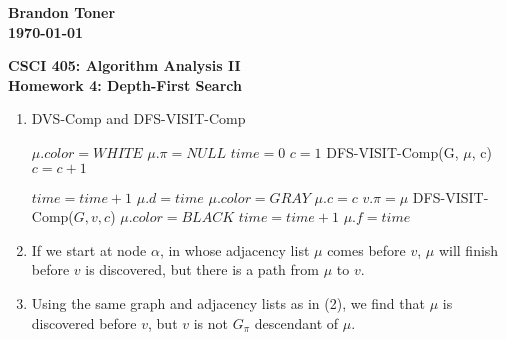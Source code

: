 \documentclass{article}%
\begin{document}
\begin{flushright}
\textbf{Brandon Toner \\
\today}
\end{flushright}

\begin{center}
\textbf{CSCI 405: Algorithm Analysis II \\
Homework 4: Depth-First Search} \\
\end{center}



\begin{enumerate}
\item  DVS-Comp and DFS-VISIT-Comp \\
\begin{algorithm}[H] 
  {
   $\mu.color = WHITE$\;
   $\mu.\pi = NULL$\;
 }
 $time = 0$\;
 $c = 1$ \;
  {
    {
     DFS-VISIT-Comp(G, $\mu$, c)\;
     $c = c + 1$\;
   }
 }
\end{algorithm}

\begin{algorithm}[H]
 $time = time + 1$\;
 $\mu.d = time$\;
 $\mu.color = GRAY$\;
 $\mu.c = c$\;
  {
    {
     $v.\pi = \mu$\;
     DFS-VISIT-Comp($G, v, c$)\;
   }
 }
 $\mu.color = BLACK$\;
 $time = time + 1$\;
 $\mu.f = time$\;
\end{algorithm}
\item If we start at node $\alpha$, in whose adjacency list $\mu$ comes before $v$, $\mu$ will finish before $v$ is discovered, but there is a path from $\mu$ to $v$. \\


\item Using the same graph and adjacency lists as in (2), we find that $\mu$ is discovered before $v$, but $v$ is not $G_{\pi}$ descendant of $\mu$.
\end{enumerate}
\end{document}
